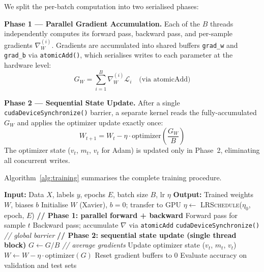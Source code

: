 \documentclass[conference]{IEEEtran}
\begin{document}
We split the per-batch computation into two serialised phases:

\textbf{Phase 1 — Parallel Gradient Accumulation.} Each of the $B$ threads independently computes its forward pass, backward pass, and per-sample gradients $\nabla_W^{(i)}$. Gradients are accumulated into shared buffers \texttt{grad\_w} and \texttt{grad\_b} via \texttt{atomicAdd()}, which serialises writes to each parameter at the hardware level:
\begin{equation}
G_W = \sum_{i=1}^{B} \nabla_W^{(i)} \mathcal{L}_i \quad \text{(via atomicAdd)}
\end{equation}

\textbf{Phase 2 — Sequential State Update.} After a single \texttt{cudaDeviceSynchronize()} barrier, a separate kernel reads the fully-accumulated $G_W$ and applies the optimizer update exactly once:
\begin{equation}
W_{t+1} = W_t - \eta \cdot \text{optimizer}\!\left(\frac{G_W}{B}\right)
\end{equation}
The optimizer state ($v_t$, $m_t$, $v_t$ for Adam) is updated only in Phase~2, eliminating all concurrent writes.

Algorithm~\ref{alg:training} summarises the complete training procedure.

\begin{algorithm}
\caption{CUDAnet Training with 2PGA}
\label{alg:training}
\begin{algorithmic}[1]
\STATE \textbf{Input:} Data $X$, labels $y$, epochs $E$, batch size $B$, lr $\eta$
\STATE \textbf{Output:} Trained weights $W$, biases $b$
\STATE Initialise $W$ (Xavier), $b=0$; transfer to GPU
    \STATE $\eta \leftarrow$ \textsc{LRSchedule}($\eta_0$, epoch, $E$)
        \STATE \textbf{// Phase 1: parallel forward + backward}
            \STATE Forward pass for sample $t$
            \STATE Backward pass; accumulate $\nabla$ via \texttt{atomicAdd}
        \ENDFOR
        \STATE \texttt{cudaDeviceSynchronize()} \hfill\textit{// global barrier}
        \STATE \textbf{// Phase 2: sequential state update (single thread block)}
        \STATE $G \leftarrow G / B$ \hfill\textit{// average gradients}
        \STATE Update optimizer state ($v_t$, $m_t$, $v_t$)
        \STATE $W \leftarrow W - \eta \cdot \text{optimizer}(G)$
        \STATE Reset gradient buffers to 0
    \ENDFOR
    \STATE Evaluate accuracy on validation and test sets
\ENDFOR
\end{algorithmic}
\end{algorithm}
\end{document}
